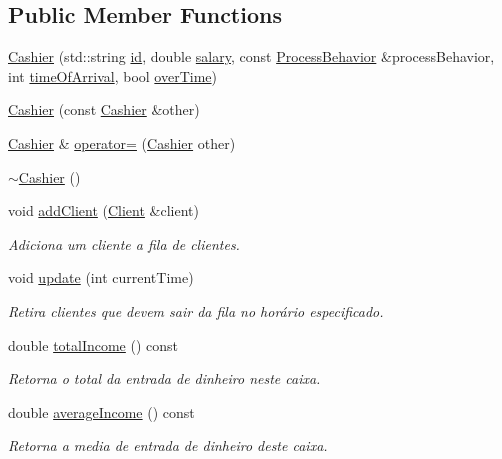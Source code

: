\subsection*{Public Member Functions}
\begin{DoxyCompactItemize}
\item 
\hyperlink{classCashier_ae0b9b991bed233e91d802ed24a1689a0}{Cashier} (std\-::string \hyperlink{classCashier_a5c32d6426d9e272649151a965564afb1}{id}, double \hyperlink{classCashier_ad394576caf7eb468ce5684181b53c83f}{salary}, const \hyperlink{classProcessBehavior}{Process\-Behavior} \&process\-Behavior, int \hyperlink{classCashier_ac0bc4c8f7d5317f296a6ed103a75dfe4}{time\-Of\-Arrival}, bool \hyperlink{classCashier_a61d85cd680cc3611c5e9fa6d12544236}{over\-Time})
\item 
\hyperlink{classCashier_aa3438cc7699379f97fb86204cee96f3b}{Cashier} (const \hyperlink{classCashier}{Cashier} \&other)
\item 
\hyperlink{classCashier}{Cashier} \& \hyperlink{classCashier_ae50bc394e4ac4ee80817aff2b8ecd846}{operator=} (\hyperlink{classCashier}{Cashier} other)
\item 
\hyperlink{classCashier_af69977426e869d157423fe6d0d4d08ac}{$\sim$\-Cashier} ()
\item 
void \hyperlink{classCashier_a8a0e504ffb0178331eac83900182de06}{add\-Client} (\hyperlink{classClient}{Client} \&client)
\begin{DoxyCompactList}\small\item\em Adiciona um cliente a fila de clientes. \end{DoxyCompactList}\item 
void \hyperlink{classCashier_ae84eef690ba7beb9c38e1813bf4a4934}{update} (int current\-Time)
\begin{DoxyCompactList}\small\item\em Retira clientes que devem sair da fila no horário especificado. \end{DoxyCompactList}\item 
double \hyperlink{classCashier_a21fec12d0be5f4ae5f530ff0ee0d6c6e}{total\-Income} () const 
\begin{DoxyCompactList}\small\item\em Retorna o total da entrada de dinheiro neste caixa. \end{DoxyCompactList}\item 
double \hyperlink{classCashier_aef70a7f98c9049e74830abdc3ef16e48}{average\-Income} () const 
\begin{DoxyCompactList}\small\item\em Retorna a media de entrada de dinheiro deste caixa. \end{DoxyCompactList}\item 

\end{DoxyCompactItemize}
